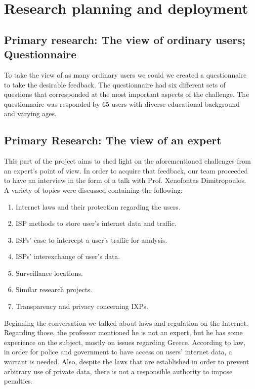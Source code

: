 \section{Research planning and deployment}

\subsection{Primary research: The view of ordinary users; Questionnaire}

To take the view of as many ordinary users we could we created a questionnaire 
to take the desirable feedback. The questionnaire had six different sets of 
questions that corresponded at the most important aspects of the challenge. The 
questionnaire was responded by 65 users with diverse educational background and 
varying ages.

\subsection{Primary Research: The view of an expert}

This part of the project aims to shed light on the aforementioned challenges 
from an expert's point of view. In order to acquire that feedback, our team 
proceeded to have an interview in the form of a talk with Prof. Xenofontas 
Dimitropoulos. A variety of topics were discussed containing the following:
\begin{enumerate}
\item{Internet laws and their protection regarding the users.}
\item{ISP methods to store user's internet data and traffic.}
\item{ISPs' ease to intercept a user's traffic for analysis.}
\item{ISPs' interexchange of user's data.}
\item{Surveillance locations.}
\item{Similar research projects.} 
\item{Transparency and privacy concerning IXPs.}
\end{enumerate}

Beginning the conversation we talked about laws and regulation on the Internet. 
Regarding those, the professor mentioned he is not an expert, but he has some 
experience on the subject, mostly on issues regarding Greece. According to law, 
in order for police and government to have access on users’ internet data, a 
warrant is needed. Also, despite the laws that are established in order to 
prevent arbitrary use of private data, there is not a responsible authority to 
impose penalties.

